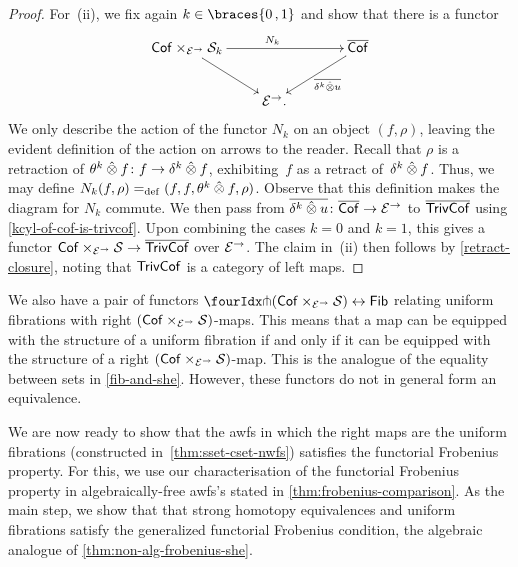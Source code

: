 \documentclass[reqno,10pt,a4paper,oneside,draft]{amsart}
\begin{document}
{{\begin{proof}
For~(ii), we fix again $k \in \braces{0\,, 1}$ and show that there is a functor
\begin{equation} \label{lem:from-strong-hequiv}
\begin{gathered}
\xymatrix@!C@C-2em{
  \Cof \times_{\cal{E}^\to} \cal{S}_k
  \ar[dr]
  \ar[rr]^{N_k}
&&
  \overline{\Cof}
  \ar[dl]^-{\overline{\kcyl \hatotimes u}}
\\&
  \catE^\to
\rlap{.}}
\end{gathered}
\end{equation}
We only describe the action of the functor $N_k$ on an object $(f, \rho)$, leaving the evident definition of the action on arrows to the reader.
Recall that $\rho$ is a retraction of $\thetak \hatotimes f \co f \to \kcyl \hatotimes f$, exhibiting~$f$ as a retract of~$\kcyl \hatotimes f$.
Thus, we may define $N_k(f, \rho) \defeq (f, f, \thetak \hatotimes f, \rho)$.
Observe that this definition makes the diagram for $N_k$ commute.
We then pass from $\overline{\kcyl \hatotimes u} \co \overline{\Cof} \to \cal{E}^\to$ to $\overline{\TrivCof}$ using \cref{kcyl-of-cof-is-trivcof}.
Upon combining the cases $k = 0$ and $k = 1$, this gives a functor $\Cof \times_{\cal{E}^\to} \cal{S} \to \overline{\TrivCof}$ over $\cal{E}^\to$.
The claim in~(ii) then follows by \cref{retract-closure}, noting that $\TrivCof$ is a category of left maps.
\end{proof}

\begin{remark} \label{relating-strong-hequiv-and-uniform-fib}
We also have a pair of functors $\liftr{(\Cof \times_{\cal{E}^\to} \cal{S})} \leftrightarrow \Fib$ relating uniform fibrations with right $(\Cof \times_{\cal{E}^\to} \cal{S})$-maps.
This means that a map can be equipped with the structure of a uniform fibration if and only if it can be equipped with the structure of a right $(\Cof \times_{\cal{E}^\to} \cal{S})$-map.
This is the analogue of the equality between sets in \cref{fib-and-she}.
However, these functors do not in general form an equivalence.
\end{remark}

We are now ready to show that the awfs in which the right maps are the uniform fibrations (constructed in~\cref{thm:sset-cset-nwfs}) satisfies the functorial Frobenius property.
For this, we use our characterisation of the functorial Frobenius property in algebraically-free awfs's stated in \cref{thm:frobenius-comparison}.
As the main step, we show that that strong homotopy equivalences and uniform fibrations satisfy the generalized functorial Frobenius condition, \ie the algebraic analogue of \cref{thm:non-alg-frobenius-she}.

}}
\end{document}
